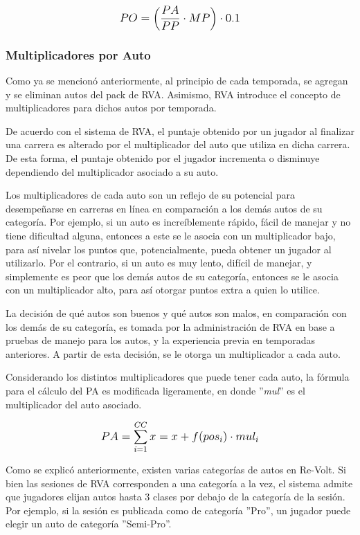 \[
\mathlarger{{PO} = \left(\frac{PA}{PP} \cdot MP\right) \cdot 0.1}
\]

\subsubsection{Multiplicadores por Auto}
Como ya se mencionó anteriormente, al principio de cada temporada, se agregan y se eliminan autos del pack de RVA. Asimismo, RVA introduce el concepto de multiplicadores para dichos autos por temporada.

De acuerdo con el sistema de RVA, el puntaje obtenido por un jugador al finalizar una carrera es alterado por el multiplicador del auto que utiliza en dicha carrera. De esta forma, el puntaje obtenido por el jugador incrementa o disminuye dependiendo del multiplicador asociado a su auto.

Los multiplicadores de cada auto son un reflejo de su potencial para desempeñarse en carreras en línea en comparación a los demás autos de su categoría. Por ejemplo, si un auto es increíblemente rápido, fácil de manejar y no tiene dificultad alguna, entonces a este se le asocia con un multiplicador bajo, para así nivelar los puntos que, potencialmente, pueda obtener un jugador al utilizarlo. Por el contrario, si un auto es muy lento, difícil de manejar, y simplemente es peor que los demás autos de su categoría, entonces se le asocia con un multiplicador alto, para así otorgar puntos extra a quien lo utilice.

La decisión de qué autos son buenos y qué autos son malos, en comparación con los demás de su categoría, es tomada por la administración de RVA en base a pruebas de manejo para los autos, y la experiencia previa en temporadas anteriores. A partir de esta decisión, se le otorga un multiplicador a cada auto.

Considerando los distintos multiplicadores que puede tener cada auto, la fórmula para el cálculo del PA es modificada ligeramente, en donde ''\textit{mul}'' es el multiplicador del auto asociado.

\[
\mathlarger{{PA} = \sum_{i=1}^{CC}x=x+f(pos_i) \cdot mul_i}
\]

Como se explicó anteriormente, existen varias categorías de autos en Re-Volt. Si bien las sesiones de RVA corresponden a una categoría a la vez, el sistema admite que jugadores elijan autos hasta 3 clases por debajo de la categoría de la sesión. Por ejemplo, si la sesión es publicada como de categoría ''Pro'', un jugador puede elegir un auto de categoría ''Semi-Pro''.

